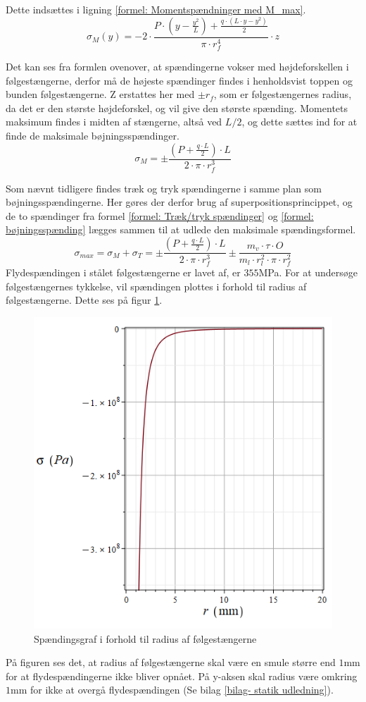 Dette indsættes i ligning \ref{formel: Momentspændninger med M_max}.
\begin{equation} \label{formel: momentspændning med M_max og I_total}
    \sigma_M(y) =-2\cdot\frac{P\cdot (y-\frac{y^2}{L})+\frac {q\cdot( L \cdot y-y^2)}{2}}{\pi\cdot r_f^4}\cdot z
\end{equation}

Det kan ses fra formlen ovenover, at spændingerne vokser med højdeforskellen i følgestængerne, derfor må de højeste spændinger findes i henholdsvist toppen og bunden følgestængerne. Z erstattes her med $\pm r_f$, som er følgestængernes radius, da det er den største højdeforskel, og vil give den største spænding. Momentets maksimum findes i midten af stængerne, altså ved $L/2$, og dette sættes ind for at finde de maksimale bøjningsspændinger.
\begin{equation}\label{formel: bøjningsspænding}
    \sigma_{M} =\pm\frac{(P+\frac {q\cdot L}{2})\cdot L}{2\cdot\pi\cdot r_f^3}
\end{equation}

Som nævnt tidligere findes træk og tryk spændingerne i samme plan som bøjningsspændingerne. Her gøres der derfor brug af superpositionsprincippet, og de to spændinger fra formel \ref{formel: Træk/tryk spændinger} og \ref{formel: bøjningsspænding} lægges sammen til at udlede den maksimale spændingsformel.
\begin{equation}\label{formel: Maksspænding}
    \sigma_{max}=\sigma_M+\sigma_T=\pm\frac{(P+\frac {q\cdot L}{2})\cdot L}{2\cdot\pi\cdot r_f^3}\pm\frac{m_v\cdot \tau\cdot O}{m_l\cdot r_l^2\cdot \pi \cdot r_f^2}
\end{equation}
Flydespændingen i stålet følgestængerne er lavet af, er $355$MPa. For at undersøge følgestængernes tykkelse, vil spændingen plottes i forhold til radius af følgestængerne. Dette ses på figur \ref{fig: Spænding i forhold til r}.
\begin{figure}[H]
    \centering
    \includegraphics[width=0.55\linewidth]{Sections/6 Detaljeløsning/Media/Spænding ifht. r.png}
    \caption{Spændingsgraf i forhold til radius af følgestængerne}
    \label{fig: Spænding i forhold til r}
\end{figure}
På figuren ses det, at radius af følgestængerne skal være en smule større end $1$mm for at flydespændingerne ikke bliver opnået. På y-aksen skal radius være omkring $1$mm for ikke at overgå flydespændingen (Se bilag \ref{bilag- statik udledning}).

